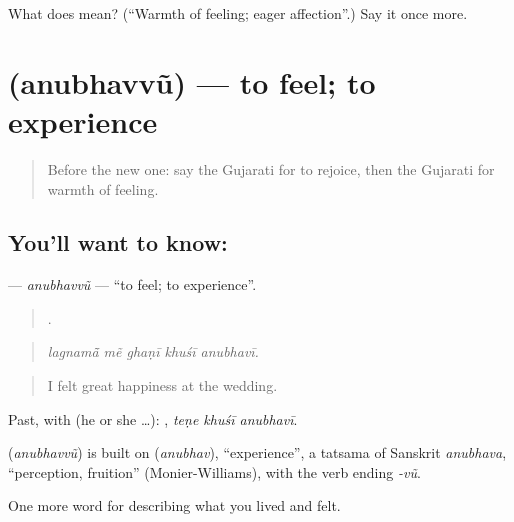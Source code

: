 \begin{tcolorbox}[breakable,colback=teal!4,colframe=teal!35!black,title={Before you move on}]
What does  mean? (\textquotedblleft{}Warmth of feeling; eager affection\textquotedblright{}.) Say it once more.
\end{tcolorbox}
\section[\texorpdfstring{\gu{અનુભવવું} (anubhavvũ)}{અનુભવવું (anubhavvũ)}]{ (anubhavvũ) — to feel; to experience}

\label{lesson:GU-C447-anubhavvu}



\begin{quote}
Before the new one: say the Gujarati for to rejoice, then the Gujarati for warmth of feeling.
\end{quote}

\subsection*{You'll want to know: }
\textbf{} — \emph{anubhavvũ} — \textquotedblleft{}to feel; to experience\textquotedblright{}.

\begin{quote}
    .
\end{quote}

\begin{quote}
\emph{lagnamā̃ mẽ ghaṇī khuśī anubhavī.}
\end{quote}

\begin{quote}
I felt great happiness at the wedding.
\end{quote}

Past, with  (he or she …):   , \emph{teṇe khuśī anubhavī}.

\begin{cousinweb}
\textbf{} (\emph{anubhavvũ}) is built on \textbf{} (\emph{anubhav}), \textquotedblleft{}experience\textquotedblright{}, a tatsama of Sanskrit \emph{anubhava}, \textquotedblleft{}perception, fruition\textquotedblright{} (Monier-Williams), with the verb ending \emph{-vũ}.
\end{cousinweb}

\begin{grammarlens}[title={What you've built}]
One more word for describing what you lived and felt.
\end{grammarlens}

